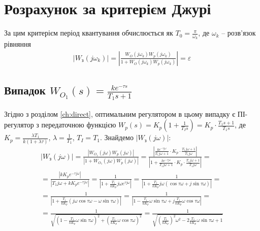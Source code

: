 \section{Розрахунок за критерієм Джурі}
За цим критерієм період квантування обчислюється як $T_0 = \frac{\pi}{\omega_k}$, де 
$\omega_k$ -- розв'язок рівняння
\begin{gather}
    \left| W_{\text{з}}(j\omega_k) \right|
    = \left|
        \frac{W_O (j \omega_k) W_p (j \omega_k)}{
            1 + W_O (j \omega_k) W_p (j \omega_k)
        }
    \right| = \varepsilon
\end{gather}

\subsection{Випадок \texorpdfstring{$W_{O_1}(s) = \frac{k e^{-\tau s}}{T_1 s + 1}$}{1}}
Згідно з розділом \ref{ch:direct}, оптимальним регулятором в цьому випадку є ПІ-регулятор з передаточною функцією 
$W_p(s) = K_p \left(1 + \frac{1}{T_I s}\right) = K_p \cdot \frac{T_1 s + 1}{T_1 s}$, де $K_p = \frac{\lambda T_1}{k \left(1 + \lambda \tau\right)}$, $\lambda = \frac{1}{T_1}$, $T_I = T_1$.
Знайдемо $\left| W_{\text{з}}(j\omega) \right|$:
\begin{gather*}
    \left| W_{\text{з}}(j\omega) \right| = \frac{
        \left| W_{O_1} (j \omega) W_p (j \omega) \right|
    }{
        \left| 1 + W_{O_1} (j \omega) W_p (j \omega) \right|
    } = 
    \frac{
        \left|\frac{k e^{-\tau j \omega}}{T_1 j \omega + 1} \cdot  K_p \cdot \frac{T_1 j \omega + 1}{T_1 j \omega} \right|
    }{
        \left|1 + \frac{k e^{-\tau j \omega}}{T_1 j \omega + 1} \cdot  K_p \cdot \frac{T_1 j \omega + 1}{T_1 j \omega} \right|
    } = \\ =
    \frac{
        \left|k K_p e^{-\tau j \omega} \right|
    }{
        \left|T_1 j \omega + k K_p  e^{-\tau j \omega} \right|
    } = \frac{
        1
    }{
        \left|1 + \frac{T_1}{k K_p} j \omega e^{\tau j \omega} \right|
    } = \frac{
        1
    }{
        \left|1 + \frac{T_1}{k K_p} j \omega \left(\cos \tau\omega + j \sin \tau\omega\right) \right|
    } = \\ =
    \frac{
        1
    }{
        \left| 1 + \frac{T_1}{k K_p}
        \left(j \omega \cos \tau\omega - \omega \sin \tau\omega\right) \right|
    } = \frac{
        1
    }{
        \left| 1 - \frac{T_1}{k K_p} \omega \sin \tau\omega + 
        j \frac{T_1}{k K_p} \omega \cos \tau\omega\right|
    } = \\ = \frac{
        1
    }{
        \sqrt{
            \left(1 - \frac{T_1}{k K_p} \omega \sin \tau\omega\right)^2 +
            \left(\frac{T_1}{k K_p} \omega \cos \tau\omega\right)^2
        }
    } = \frac{
        1
    }{
        \sqrt{
            \left(\frac{T_1}{k K_p}\right)^2 \omega^2 - 2\frac{T_1}{k K_p} \omega \sin \tau\omega + 1
        }
    }
\end{gather*}
